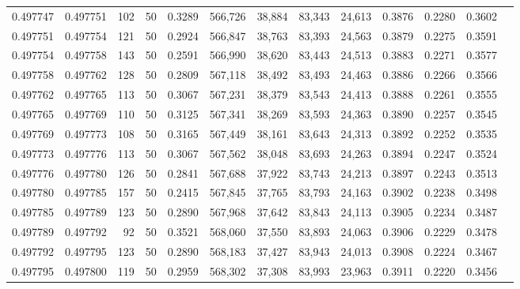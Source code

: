 \begin{tabular}{rrrrrrrrrrrrr}
0.497747 & 0.497751 &   102 &  50 &                                     0.3289 & 566,726 &  38,884 &  83,343 &  24,613 & 0.3876 & 0.2280 & 0.3602 \\
0.497751 & 0.497754 &   121 &  50 &                                     0.2924 & 566,847 &  38,763 &  83,393 &  24,563 & 0.3879 & 0.2275 & 0.3591 \\
0.497754 & 0.497758 &   143 &  50 &                                     0.2591 & 566,990 &  38,620 &  83,443 &  24,513 & 0.3883 & 0.2271 & 0.3577 \\
0.497758 & 0.497762 &   128 &  50 &                                     0.2809 & 567,118 &  38,492 &  83,493 &  24,463 & 0.3886 & 0.2266 & 0.3566 \\
0.497762 & 0.497765 &   113 &  50 &                                     0.3067 & 567,231 &  38,379 &  83,543 &  24,413 & 0.3888 & 0.2261 & 0.3555 \\
0.497765 & 0.497769 &   110 &  50 &                                     0.3125 & 567,341 &  38,269 &  83,593 &  24,363 & 0.3890 & 0.2257 & 0.3545 \\
0.497769 & 0.497773 &   108 &  50 &                                     0.3165 & 567,449 &  38,161 &  83,643 &  24,313 & 0.3892 & 0.2252 & 0.3535 \\
0.497773 & 0.497776 &   113 &  50 &                                     0.3067 & 567,562 &  38,048 &  83,693 &  24,263 & 0.3894 & 0.2247 & 0.3524 \\
0.497776 & 0.497780 &   126 &  50 &                                     0.2841 & 567,688 &  37,922 &  83,743 &  24,213 & 0.3897 & 0.2243 & 0.3513 \\
0.497780 & 0.497785 &   157 &  50 &                                     0.2415 & 567,845 &  37,765 &  83,793 &  24,163 & 0.3902 & 0.2238 & 0.3498 \\
0.497785 & 0.497789 &   123 &  50 &                                     0.2890 & 567,968 &  37,642 &  83,843 &  24,113 & 0.3905 & 0.2234 & 0.3487 \\
0.497789 & 0.497792 &    92 &  50 &                                     0.3521 & 568,060 &  37,550 &  83,893 &  24,063 & 0.3906 & 0.2229 & 0.3478 \\
0.497792 & 0.497795 &   123 &  50 &                                     0.2890 & 568,183 &  37,427 &  83,943 &  24,013 & 0.3908 & 0.2224 & 0.3467 \\
0.497795 & 0.497800 &   119 &  50 &                                     0.2959 & 568,302 &  37,308 &  83,993 &  23,963 & 0.3911 & 0.2220 & 0.3456 \\

\end{tabular}
